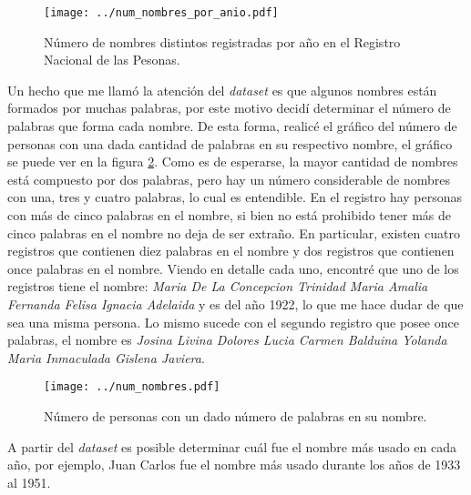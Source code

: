 \documentclass[10pt,a4paper]{article}
\begin{document}
\begin{figure}[t]
\begin{center}
\texttt{[image: ../num\_nombres\_por\_anio.pdf]}
\end{center}
\caption{\label{fig2} N\'umero de nombres distintos registradas por a\~no en el Registro 
Nacional de las Pesonas.}
\end{figure}

Un hecho que me llam\'o la atenci\'on del {\em dataset} es que algunos nombres est\'an 
formados por muchas palabras, por este motivo decid\'i determinar el n\'umero de 
palabras que forma cada nombre. De esta forma, realic\'e el gr\'afico del n\'umero de 
personas con una dada cantidad de palabras en su respectivo nombre, el gr\'afico se 
puede ver en la figura \ref{fig3}. Como es de esperarse, la mayor cantidad de nombres est\'a 
compuesto por dos palabras, pero hay un n\'umero considerable de nombres con una, tres y cuatro 
palabras, lo cual es entendible. En el registro hay personas con m\'as de cinco palabras en el nombre, 
si bien
no est\'a prohibido tener m\'as de cinco palabras en el nombre no deja de ser extra\~no. En particular, 
existen cuatro registros que contienen diez palabras en el nombre y dos registros que contienen once 
palabras en el nombre. Viendo en detalle cada uno, encontr\'e que uno de los registros tiene el nombre:
{\em Maria De La Concepcion Trinidad Maria Amalia Fernanda Felisa Ignacia Adelaida} y es del a\~no 1922, 
lo que me hace dudar de que sea una misma persona. Lo mismo sucede con el segundo registro que posee 
once palabras, el nombre es {\em Josina Livina Dolores Lucia Carmen Balduina Yolanda Maria Inmaculada 
Gislena Javiera}.

\begin{figure}[h!]
\begin{center}
\texttt{[image: ../num\_nombres.pdf]}
\end{center}
\caption{\label{fig3} N\'umero de personas con un dado n\'umero de palabras en su 
nombre.}
\end{figure}

A partir del {\em dataset} es posible determinar cu\'al fue el nombre m\'as usado en cada a\~no, por 
ejemplo, Juan Carlos fue el nombre m\'as usado durante los a\~nos de 1933 al 1951. 
\end{document}

